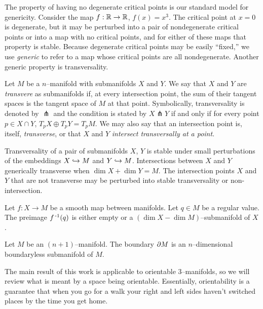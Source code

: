 The property of having no degenerate critical points is our standard model for genericity.
Consider the map $f:\mathbb{R}\to\mathbb{R}$, $f(x)=x^3$.
The critical point at $x=0$ is degenerate, but it may be perturbed into a pair of nondegenerate critical points or into a map with no critical points, and for either of these maps that property is stable.
Because degenerate critical points may be easily ``fixed,'' we use \emph{generic} to refer to a map whose critical points are all nondegenerate.
Another generic property is transversality.

\begin{defn}
	Let $M$ be a $n$--manifold with submanifolds $X$ and $Y$.
	We say that $X$ and $Y$ are \emph{transvere} as submanifolds if, at every intersection point, the sum of their tangent spaces is the tangent space of $M$ at that point.
	Symbolically, transversality is denoted by $\pitchfork$ and the condition is stated by $X\pitchfork Y$ if and only if for every point $p\in X\cap Y$, $T_p X\oplus T_p Y=T_p M$.
	We may also say that an intersection point is, itself, \emph{transverse}, or that $X$ and $Y$ \emph{intersect transversally at a point}.	
\end{defn}

Transversality of a pair of submanifolds $X$, $Y$ is stable under small perturbations of the embeddings $X\hookrightarrow M$ and $Y\hookrightarrow M$.
Intersections between $X$ and $Y$ generically transverse when $\dim X + \dim Y = M$.
The intersection points $X$ and $Y$ that are not transverse may be perturbed into stable transversality or non-intersection.

\begin{theorem}
	Let $f:X\to M$ be a smooth map between manifolds.
	Let $q\in M$ be a regular value.
	The preimage $f^{\,\text{-}1}(q)$ is either empty or a $(\dim X-\dim M)$--submanifold of $X$.
\end{theorem}

\begin{prop}
	\label{prop:boundariesaremanifolds}
	Let $M$ be an $(n+1)$--manifold.
	The boundary $\partial M$ is an $n$--dimensional boundaryless submanifold of $M$.
\end{prop}

The main result of this work is applicable to orientable 3--manifolds, so we will review what is meant by a space being orientable.
Essentially, orientability is a guarantee that when you go for a walk your right and left sides haven't switched places by the time you get home.

